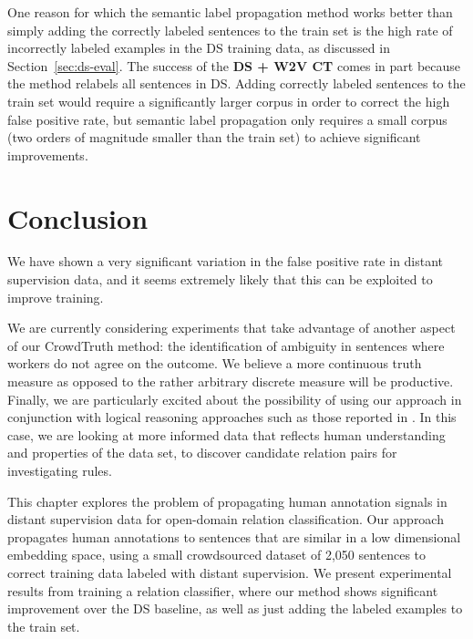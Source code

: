 One reason for which the semantic label propagation method works better than simply adding the correctly labeled sentences to the train set is the high rate of incorrectly labeled examples in the DS training data, as discussed in Section~\ref{sec:ds-eval}. %
The success of the \textbf{DS + W2V CT} comes in part because the method relabels all sentences in DS. Adding correctly labeled sentences to the train set would require a significantly larger corpus in order to correct the high false positive rate, but semantic label propagation only requires a small corpus (two orders of magnitude smaller than the train set) to achieve significant improvements.




\section{Conclusion}


We have shown a very significant variation in the false positive rate in distant supervision data, and it seems extremely likely that this can be exploited to improve training.

We are currently considering experiments that take advantage of another aspect of our CrowdTruth method: the identification of ambiguity in sentences where workers do not agree on the outcome.  We believe a more continuous truth measure as opposed to the rather arbitrary discrete measure will be productive. Finally, we are particularly excited about the possibility of using our approach in conjunction with logical reasoning approaches such as those reported in \cite{demeester2016regularizing}.  In this case, we are looking at more informed data that reflects human understanding and properties of the data set, to discover candidate relation pairs for investigating rules.


This chapter explores the problem of propagating human annotation signals in distant supervision data for open-domain relation classification.  Our approach propagates human annotations to sentences that are similar in a low dimensional embedding space, using a small crowdsourced dataset of 2,050 sentences to correct training data labeled with distant supervision.  We present experimental results from training a relation classifier, where our method shows significant improvement over the DS baseline, as well as just adding the labeled examples to the train set.

